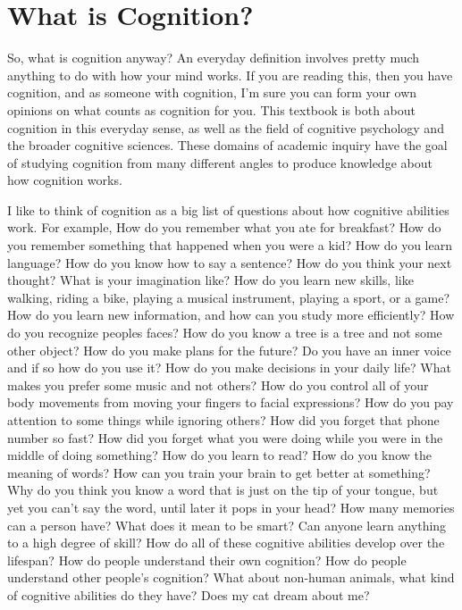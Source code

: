 \documentclass[
  oneside,
  12pt]{crumpbook}
\begin{document}
\hypertarget{what-is-cognition-1}{%
\section{What is Cognition?}\label{what-is-cognition-1}}

So, what is cognition anyway? An everyday definition involves pretty much anything to do with how your mind works. If you are reading this, then you have cognition, and as someone with cognition, I'm sure you can form your own opinions on what counts as cognition for you. This textbook is both about cognition in this everyday sense, as well as the field of cognitive psychology and the broader cognitive sciences. These domains of academic inquiry have the goal of studying cognition from many different angles to produce knowledge about how cognition works.

I like to think of cognition as a big list of questions about how cognitive abilities work. For example, How do you remember what you ate for breakfast? How do you remember something that happened when you were a kid? How do you learn language? How do you know how to say a sentence? How do you think your next thought? What is your imagination like? How do you learn new skills, like walking, riding a bike, playing a musical instrument, playing a sport, or a game? How do you learn new information, and how can you study more efficiently? How do you recognize peoples faces? How do you know a tree is a tree and not some other object? How do you make plans for the future? Do you have an inner voice and if so how do you use it? How do you make decisions in your daily life? What makes you prefer some music and not others? How do you control all of your body movements from moving your fingers to facial expressions? How do you pay attention to some things while ignoring others? How did you forget that phone number so fast? How did you forget what you were doing while you were in the middle of doing something? How do you learn to read? How do you know the meaning of words? How can you train your brain to get better at something? Why do you think you know a word that is just on the tip of your tongue, but yet you can't say the word, until later it pops in your head? How many memories can a person have? What does it mean to be smart? Can anyone learn anything to a high degree of skill? How do all of these cognitive abilities develop over the lifespan? How do people understand their own cognition? How do people understand other people's cognition? What about non-human animals, what kind of cognitive abilities do they have? Does my cat dream about me?
\end{document}
